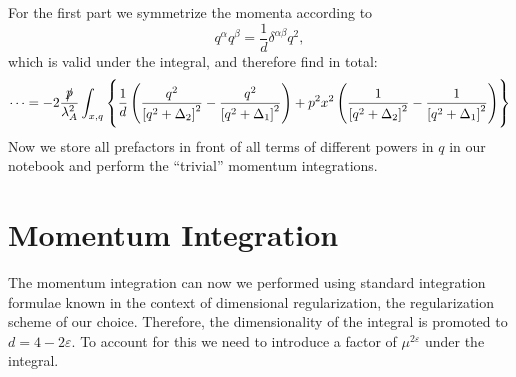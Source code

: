 \documentclass[digital, %
			   openright, %
			   parskip=half,
			   11pt]{mythesis}
\begin{document}
For the first part we symmetrize the momenta according to 
\begin{equation}
	q^{\alpha}q^{\beta} = \frac{1}{d}\delta^{\alpha\beta}q^2,
\end{equation}
which is valid under the integral, and therefore find in total:
\begin{equation}
	\cdots = -2\frac{\slashed{p}}{\lambda_A^2}\int_{x,q}\left\{\frac{1}{d}\left(\frac{q^2}{\left[q^2 + \Delta_2\right]^2} - \frac{q^2}{\left[q^2 + \Delta_1\right]^2}\right) + p^2x^2\left(\frac{1}{\left[q^2 + \Delta_2\right]^2} - \frac{1}{\left[q^2 + \Delta_1\right]^2}\right)\right\}
\end{equation}
Now we store all prefactors in front of all terms of different powers in $q$ in our notebook and perform the \enquote{trivial} momentum integrations. 
\section*{Momentum Integration}

The momentum integration can now we performed using standard integration formulae known in the context of dimensional regularization, the regularization scheme of our choice. Therefore, the  dimensionality of the integral is promoted to $d= 4 -2\varepsilon$. To account for this we need to introduce a factor of $\mu^{2\varepsilon}$ under the integral.
\end{document}
